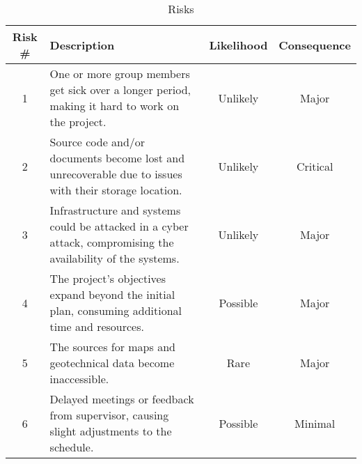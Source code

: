 \begin{table}[H]
    \centering
    \begin{tabularx}{\textwidth}{|c|>{\centering\arraybackslash}X|c|c|}
    \hline
    \textbf{Risk \#} & \textbf{Description} & \textbf{Likelihood} & \textbf{Consequence} \\
    \hline
    1 & One or more group members get sick over a longer period, making it hard to work on the project. & Unlikely \cellcolor[HTML]{ffC300} & Major \cellcolor[HTML]{ffC300} \\
    \hline
    2 & Source code and/or documents become lost and unrecoverable due to issues with their storage location. & Unlikely \cellcolor[HTML]{ffC300} & Critical \cellcolor[HTML]{ffC300} \\
    \hline
    3 & Infrastructure and systems could be attacked in a cyber attack, compromising the availability of the systems. & Unlikely \cellcolor[HTML]{ffC300} & Major \cellcolor[HTML]{ffC300} \\
    \hline
    4 & The project's objectives expand beyond the initial plan, consuming additional time and resources. & Possible \cellcolor[HTML]{ffC300} & Major \cellcolor[HTML]{ffC300} \\
    \hline
    5 & The sources for maps and geotechnical data become inaccessible. & Rare \cellcolor[HTML]{fff000} & Major \cellcolor[HTML]{fff000} \\
    \hline
    6 & Delayed meetings or feedback from supervisor, causing slight adjustments to the schedule. & Possible \cellcolor[HTML]{74ff00} & Minimal \cellcolor[HTML]{74ff00} \\
    \hline
    \end{tabularx}
    \caption{Risks}
    \label{tab:risks}
\end{table}

